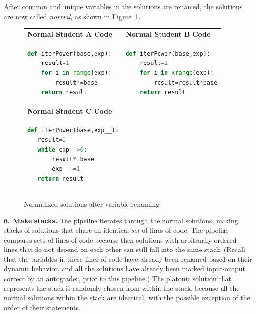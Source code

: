 After common and unique variables in the solutions are renamed, the solutions are now called {\it normal}, as shown in Figure~\ref{fig:normalcode}.
\begin{figure}
\begin{tabular}{ll}

{\bf Normal Student A Code} & {\bf Normal Student B Code} \\ 

\begin{minipage}{0.5\linewidth}
\begin{lstlisting}[basicstyle=\linespread{1.0}\ttfamily\footnotesize,language=python]
def iterPower(base,exp):
    result=1
    for i in range(exp):
        result*=base
    return result
\end{lstlisting}
\end{minipage} &
\begin{minipage}{0.5\linewidth}
\begin{lstlisting}[basicstyle=\linespread{1.0}\ttfamily\footnotesize,language=python]
def iterPower(base,exp):
    result=1
    for i in xrange(exp):
        result=result*base
    return result
\end{lstlisting}
\end{minipage}
\\
{\bf Normal Student C Code} &  \\
\begin{minipage}{0.5\linewidth}
\begin{lstlisting}[basicstyle=\linespread{1.0}\ttfamily\footnotesize,language=python]
def iterPower(base,exp__):
   result=1
   while exp__>0:
       result*=base
       exp__-=1
   return result
\end{lstlisting}
\end{minipage}
& \\
\end{tabular}
\caption{Normalized solutions after variable renaming.}
\label{fig:normalcode}
\end{figure}

{\bf 6. Make stacks.} The pipeline iterates through the normal solutions, making stacks of solutions that share an identical {\it set} of lines of code. The pipeline compares sets of lines of code because then solutions with arbitrarily ordered lines that do not depend on each other can still fall into the same stack. (Recall that the variables in these lines of code have already been renamed based on their dynamic behavior, and all the solutions have already been marked input-output correct by an autograder, prior to this pipeline.) The platonic solution that represents the stack is randomly chosen from within the stack, because all the normal solutions within the stack are identical, with the possible exception of the order of their statements. 

